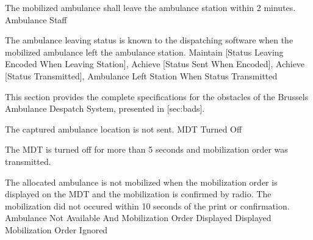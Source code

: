   \startkaosspec
  	 {The mobilized ambulance shall leave the ambulance station within 2 minutes.}
  	 {Ambulance Staff}
  \stopkaosspec
  
  \startkaosspec
  	 {The ambulance leaving status is known to the dispatching software when the mobilized ambulance left the ambulance station.}
  	 {Maintain [Status Leaving Encoded When Leaving Station], Achieve [Status Sent When Encoded], Achieve [Status Transmitted], Ambulance Left Station When Status Transmitted}
  \stopkaosspec
  
\stopsubsection

\startsubsection[title={Obstacle specifications}]

  This section provides the complete specifications for the obstacles of the
  Brussels Ambulance Despatch System, presented in [sec:bads].

  
    {}
  
  \startkaosspec
  	 {The captured ambulance location is not sent.}
  	 {MDT Turned Off}
  \stopkaosspec

  \startkaosspec
  	 {The MDT is turned off for more than 5 seconds and mobilization order was transmitted.}
  \stopkaosspec
  
  
    {}
  
  \startkaosspec
  	 {The allocated ambulance is not mobilized when the mobilization order is displayed on the MDT and the mobilization is confirmed by radio. The mobilization did not occured within 10 seconds of the print or confirmation.}
  	 {Ambulance Not Available And Mobilization Order Displayed}
  	 {Displayed Mobilization Order Ignored}
  \stopkaosspec
  
